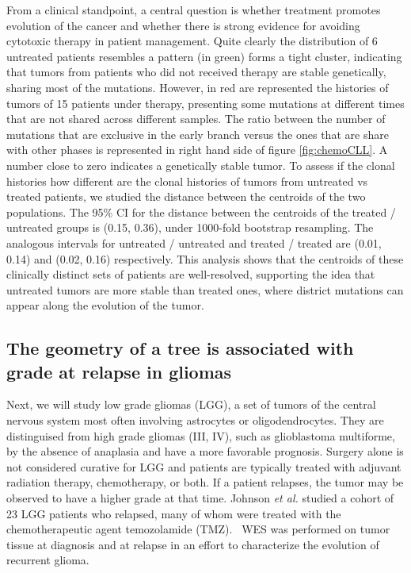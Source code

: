 \documentclass[a4paper,11pt]{article}
\begin{document}
From a clinical standpoint, a central question is whether treatment promotes evolution of the cancer and whether there is strong evidence for avoiding cytotoxic therapy in patient management.
Quite clearly the distribution of 6 untreated patients resembles a pattern (in green) forms a tight cluster, indicating that tumors from patients who did not received therapy are stable genetically, sharing most of the mutations.
However, in red are represented the histories of tumors of 15 patients under therapy, presenting some mutations at different times that are not shared across different samples.
The ratio between the number of mutations that are exclusive in the early branch versus the ones that are share with other phases is represented in right hand side of figure \ref{fig:chemoCLL}.
A number close to zero indicates a genetically stable tumor.
To assess if the clonal histories how different are the clonal histories of tumors from untreated vs treated patients, we studied the distance between the centroids of the two populations.
The 95\% CI for the distance between the centroids of the treated / untreated groups is (0.15, 0.36), under 1000-fold bootstrap resampling.
The analogous intervals for untreated / untreated and treated / treated are (0.01, 0.14) and (0.02, 0.16) respectively.
This analysis shows that the centroids of these clinically distinct sets of patients are well-resolved, supporting the idea that untreated tumors are more stable than treated ones, where district mutations can appear along the evolution of the tumor.

\subsection{The geometry of a tree is associated with grade at relapse in gliomas}

Next, we will study low grade gliomas (LGG), a set of tumors of the central nervous system most often involving astrocytes or oligodendrocytes.
They are distinguised from high grade gliomas (III, IV), such as glioblastoma multiforme, by the absence of anaplasia and have a more favorable prognosis.
Surgery alone is not considered curative for LGG and patients are typically treated with adjuvant radiation therapy, chemotherapy, or both.
If a patient relapses, the tumor may be observed to have a higher grade at that time.
Johnson \textit{et al.} studied a cohort of 23 LGG patients who relapsed, many of whom were treated with the chemotherapeutic agent temozolamide (TMZ).~\cite{johnson2014mutational}
WES was performed on tumor tissue at diagnosis and at relapse in an effort to characterize the evolution of recurrent glioma.
\end{document}
